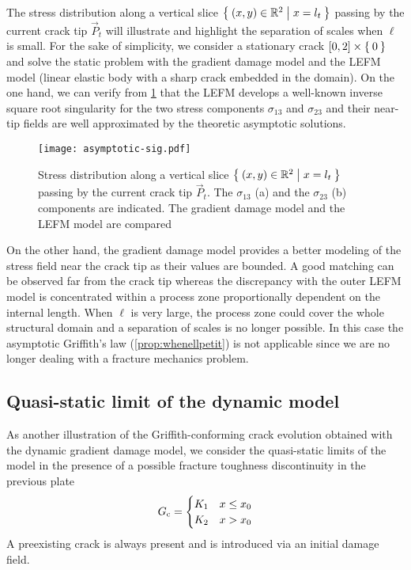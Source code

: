 The stress distribution along a vertical slice $\Set{(x,y)\in\mathbb{R}^2|x=l_t}$ passing by the current crack tip $\vec{P}_t$ will illustrate and highlight the separation of scales when $\ell$ is small. For the sake of simplicity, we consider a stationary crack $[0,2]\times\Set{0}$ and solve the static problem with the gradient damage model and the LEFM model (linear elastic body with a sharp crack embedded in the domain). On the one hand, we can verify from \cref{fig:stress} that the LEFM develops a well-known inverse square root singularity for the two stress components $\sigma_{13}$ and $\sigma_{23}$ and their near-tip fields are well approximated by the theoretic asymptotic solutions.
\begin{figure}[htbp]
\centering
\texttt{[image: asymptotic-sig.pdf]}
\caption{Stress distribution along a vertical slice $\Set{(x,y)\in\mathbb{R}^2|x=l_t}$ passing by the current crack tip $\vec{P}_t$. The $\sigma_{13}$ (a) and the $\sigma_{23}$ (b) components are indicated. The gradient damage model and the LEFM model are compared} \label{fig:stress}
\end{figure}
On the other hand, the gradient damage model provides a better modeling of the stress field near the crack tip as their values are bounded. A good matching can be observed far from the crack tip whereas the discrepancy with the outer LEFM model is concentrated within a process zone proportionally dependent on the internal length. When $\ell$ is very large, the process zone could cover the whole structural domain and a separation of scales is no longer possible. In this case the asymptotic Griffith's law (\cref{prop:whenellpetit}) is not applicable since we are no longer dealing with a fracture mechanics problem.

\subsection{Quasi-static limit of the dynamic model}
As another illustration of the Griffith-conforming crack evolution obtained with the dynamic gradient damage model, we consider the quasi-static limits of the model in the presence of a possible fracture toughness discontinuity in the previous plate
\[
G_\mathrm{c}=\begin{cases}
K_1 & x\leq x_0 \\
K_2 & x>x_0
\end{cases}
\]
A preexisting crack is always present and is introduced via an initial damage field.

